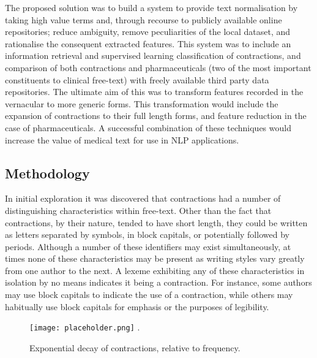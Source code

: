 The proposed solution was to build a system to provide text normalisation by taking high value terms and, through recourse to publicly available online repositories; reduce ambiguity, remove peculiarities of the local
dataset, and rationalise the consequent extracted features. This system was to include an information retrieval and supervised learning classification of contractions, and comparison of both contractions and pharmaceuticals (two of the most important constituents to clinical free-text) with freely available third party data repositories. The ultimate aim of this was to transform features recorded in the vernacular to more generic forms. This transformation would include the expansion of contractions to their full length forms, and
feature reduction in the case of pharmaceuticals. A successful combination of these techniques would increase the value of medical text for use in NLP applications. 

\subsection{Methodology}

In initial exploration it was discovered that contractions had a number of distinguishing characteristics within free-text. Other than the fact that contractions, by their nature, tended to have short length, they could be written as letters separated by symbols, in block capitals, or potentially followed by periods. Although a number of these identifiers may exist simultaneously, at times none of these characteristics may be present as writing styles vary greatly from one author to the next. A lexeme exhibiting any of these characteristics in
isolation by no means indicates it being a contraction. For instance, some authors may use block capitals to indicate the use of a contraction, while others may habitually use block capitals for emphasis or the purposes of legibility. 

\begin{figure}
\centering
\texttt{[image: placeholder.png]} %
\DeclareGraphicsExtensions.
\caption{Exponential decay of contractions, relative to frequency.}
\label{fig:abb}
\end{figure}

\VerbatimFootnotes

